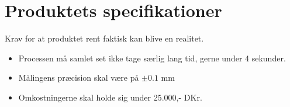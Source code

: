 \section{Produktets specifikationer\label{specs}}

Krav for at produktet rent faktisk kan blive en realitet.

\begin{itemize}
    \item Processen må samlet set ikke tage særlig lang tid, gerne under 4 sekunder.
    \item Målingens præcision skal være på $\pm 0.1$ mm
    \item Omkostningerne skal holde sig under 25.000,- DKr.
\end{itemize}